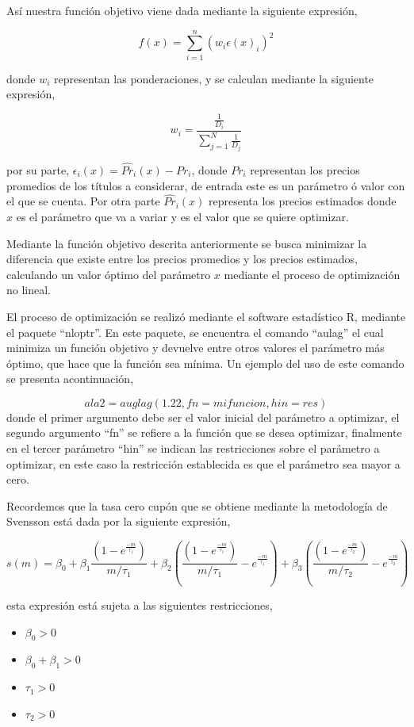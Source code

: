 \documentclass[
  12pt,
]{krantz}
\providecommand{\tightlist}{%
  \setlength{\itemsep}{0pt}\setlength{\parskip}{0pt}}
\begin{document}
Así nuestra función objetivo viene dada mediante la siguiente expresión,

\[
  f(x) = \sum_{i=1}^{n} (w_{i}\epsilon(x)_{i} )^2
\]

donde \(w_{i}\) representan las ponderaciones, y se calculan mediante la siguiente expresión,

\[\displaystyle{w_{i} = \frac{\frac{1}{D_{i}}}{\sum_{j=1}^{N}\frac{1}{D_{j}}}}\]

por su parte, \(\epsilon_{i}(x)= \hat{Pr}_{i}(x)-Pr_{i}\), donde \(Pr_{i}\) representan los precios promedios de los títulos a considerar, de entrada este es un parámetro ó valor con el que se cuenta. Por otra parte \(\hat{Pr}_{i}(x)\) representa los precios estimados donde \(x\) es el parámetro que va a variar y es el valor que se quiere optimizar.

Mediante la función objetivo descrita anteriormente se busca minimizar la diferencia que existe entre los precios promedios y los precios estimados, calculando un valor óptimo del parámetro \(x\) mediante el proceso de optimización no lineal.

El proceso de optimización se realizó mediante el software estadístico R, mediante el paquete ``nloptr''. En este paquete, se encuentra el comando ``aulag'' el cual minimiza un función objetivo y devuelve entre otros valores el parámetro más óptimo, que hace que la función sea mínima. Un ejemplo del uso de este comando se presenta acontinuación,

\[ala2=auglag(1.22, fn=mifuncion, hin=res)\]
donde el primer argumento debe ser el valor inicial del parámetro a optimizar, el segundo argumento ``fn'' se refiere a la función que se desea optimizar, finalmente en el tercer parámetro ``hin'' se indican las restricciones sobre el parámetro a optimizar, en este caso la restricción establecida es que el parámetro sea mayor a cero.

Recordemos que la tasa cero cupón que se obtiene mediante la metodología de Svensson está dada por la siguiente expresión,

\[\displaystyle{s(m) = \beta_{0}+ \beta_{1}\frac{\left(1-e^\frac{-m}{\tau_{1}}\right)}{m/\tau_{1}} + \beta_{2} \left(\frac{\left(1-e^\frac{-m}{\tau_{1}}\right)}{m/\tau_{1}} -  e^\frac{-m}{\tau_{1}}\right) + \beta_{3} \left(\frac{\left(1-e^\frac{-m}{\tau_{2}}\right)}{m/\tau_{2}} -  e^\frac{-m}{\tau_{2}}\right)}\]

esta expresión está sujeta a las siguientes restricciones,

\begin{itemize}
\tightlist
\item
  \(\beta_{0} > 0\)
\item
  \(\beta_{0}+\beta_{1} > 0\)
\item
  \(\tau_{1} > 0\)
\item
  \(\tau_{2} > 0\)
\end{itemize}
\end{document}
